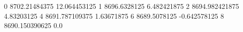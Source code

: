 0 8702.21484375 12.064453125
1 8696.6328125 6.482421875
2 8694.982421875 4.83203125
4 8691.787109375 1.63671875
6 8689.5078125 -0.642578125
8 8690.150390625 0.0
